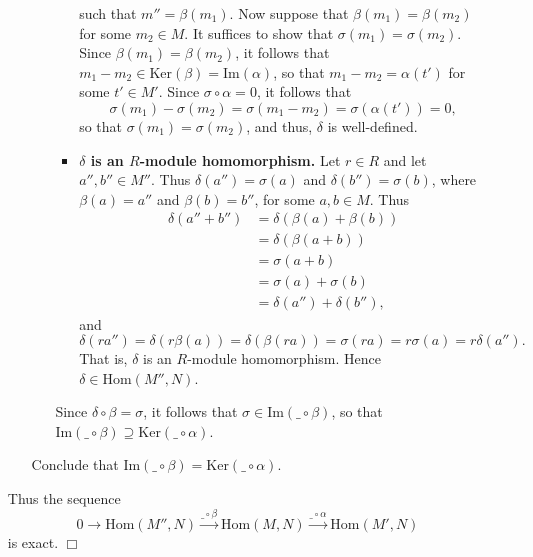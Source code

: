 \documentclass[9pt]{article}
\newcommand{\qed}{\hfill \ensuremath{\Box}}
\newcommand{\Ker}{\text{Ker}}
\newcommand{\im}{\text{Im}}
\begin{document}
\begin{enumerate}
\begin{itemize}
\begin{itemize}
\begin{itemize}
                                 such that $m'' = \beta(m_1)$. Now suppose that
                                 $\beta(m_1) = \beta(m_2)$ for some
                                 $m_2 \in M$. It suffices to show that
                                 $\sigma(m_1) = \sigma(m_2)$. Since
                                 $\beta(m_1) = \beta(m_2)$, it follows that
                                 $m_1 - m_2 \in \Ker(\beta) = \im(\alpha)$, so
                                 that $m_1 - m_2 = \alpha(t')$ for some
                                 $t' \in M'$. Since $\sigma\circ\alpha = 0$, it
                                 follows that
                                 $$\sigma(m_1) - \sigma(m_2) = \sigma(m_1 - m_2)
                                 = \sigma(\alpha(t')) = 0,$$
                                 so that $\sigma(m_1) = \sigma(m_2)$, and thus,
                                 $\delta$ is well-defined.
                           
                           \item \textbf{$\delta$ is an $R$-module
                                 homomorphism.} Let $r \in R$ and let
                                 $a'', b'' \in M''$. Thus $\delta(a'') = \sigma(a)$ and
                                 $\delta(b'') = \sigma(b)$, where $\beta(a) = a''$
                                 and $\beta(b) = b''$, for some $a, b \in M$.
                                 Thus
                                 \begin{align*}
                                    \delta(a''+b'')&=\delta(\beta(a)+\beta(b))\\
                                       &= \delta(\beta(a+b)) \\
                                       &= \sigma(a+b) \\
                                       &= \sigma(a)+\sigma(b)\\
                                       &= \delta(a'')+\delta(b''),
                                 \end{align*}
                                 and
                                 $$\delta(ra'') = \delta(r\beta(a)) =
                                   \delta(\beta(ra)) = \sigma(ra) = r\sigma(a)
                                   = r\delta(a'').$$
                                 That is, $\delta$ is an $R$-module homomorphism.
                                 Hence $\delta \in \text{Hom}(M'', N)$.
                        \end{itemize}
                        Since  $\delta\circ\beta = \sigma$, it follows that
                        $\sigma \in \im (\_\circ\beta)$, so that
                        $\im(\_\circ\beta) \supseteq \Ker(\_\circ\alpha)$.
               \end{itemize}
               Conclude that $\im(\_\circ\beta) = \Ker(\_\circ\alpha)$.
      \end{itemize}
      Thus the sequence 
               $$0 \rightarrow \text{Hom}(M'', N) \stackrel{\_\circ\beta}
               {\longrightarrow} \text{Hom}(M, N)
               \stackrel{\_\circ\alpha}{\longrightarrow} \text{Hom}(M', N)$$
               is exact. \qed
\end{enumerate}
\end{document}
